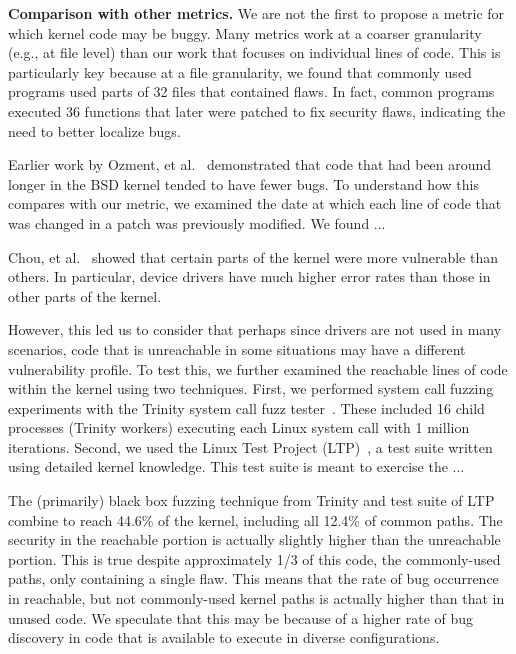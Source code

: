 \textbf{Comparison with other metrics.}
We are not the first to propose a metric for which kernel code may be buggy.
Many metrics work at a coarser granularity (e.g., at file level) than our work that focuses on
individual lines of code.  This is particularly key because at a file
granularity, we found that commonly used programs used parts of
32 files that contained flaws. In fact, common
programs executed 36 functions that later were patched to fix security
flaws, indicating the need to better localize bugs.

Earlier work by Ozment, et al.~\cite{ozment2006milk} demonstrated that code that
had been around longer in the BSD kernel tended to have fewer bugs.  To
understand how this compares with our metric, we examined the date at which
each line of code that was changed in a patch was previously modified.  We
found ...



Chou, et al.~\cite{PittSFIeld} showed that certain parts of the kernel
were more vulnerable than others. In particular, device drivers have
much higher error rates than those in other parts of the kernel.

However, this led us to consider that perhaps since drivers are not used
in many scenarios, code that is unreachable in some situations may have a
different vulnerability profile.  To test this, we
further examined the reachable lines of
code within the kernel using two techniques.  First,
we performed system call fuzzing experiments with the Trinity
system call fuzz tester~\cite{Trinity}. These included 16 child processes
(Trinity workers) executing each Linux system call with 1 million iterations.
Second, we used the Linux Test Project (LTP)~\cite{LTP}, a test suite written
using detailed kernel knowledge.  This test suite is meant to exercise the ...

The (primarily) black box fuzzing technique from Trinity and test suite of
LTP combine to reach 44.6\% of the kernel, including all 12.4\% of common
paths.  The security in the reachable portion is actually
slightly higher than the unreachable portion.  This is true despite
approximately 1/3 of this code, the commonly-used paths, only containing
a single flaw.  This means that the rate of bug occurrence in reachable, but
not commonly-used kernel paths is actually higher than that in unused
code.  We speculate that this may be because of a higher rate of bug discovery
in code that is available to execute in diverse configurations.


